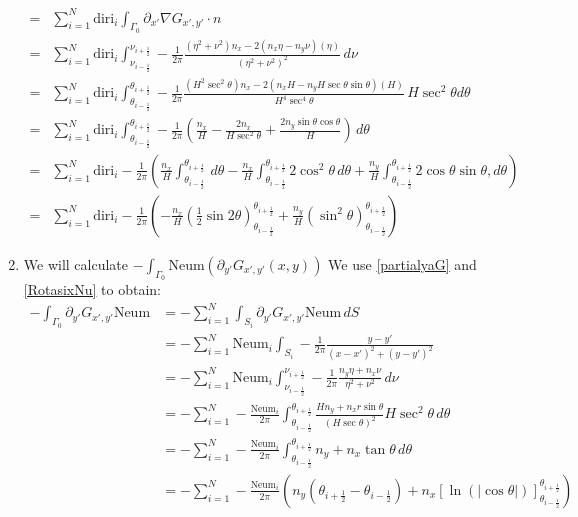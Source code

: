 \documentclass[a4paper,12pt]{article}
\newcommand{\integ}[3]{%
\ensuremath{\displaystyle{\int^{#2}_{#1} #3}}}
\begin{document}
\begin{enumerate}
\begin{align}
=& \sum\limits_{i=1}^N \text{diri}_i \integ{\Gamma_0}{}{\partial_{x'}\nabla G_{x',y'} \cdot n}\\
 =& \sum\limits_{i=1}^N \text{diri}_i \integ{\nu_{i-\frac{1}{2}}}{\nu_{i+\frac{1}{2}}}{-\frac{1}{2\pi} \frac{(\eta^2+\nu^2)n_x-2(n_x\eta-n_y\nu)(\eta)}{(\eta^2+\nu^2)^2} \, d\nu}\\
=&\sum\limits_{i=1}^N \text{diri}_i \integ{\theta_{i-\frac{1}{2}}}{\theta_{i+\frac{1}{2}}}{-\frac{1}{2\pi} \frac{(H^2 \sec^2\theta)n_x-2(n_x H-n_y H \sec \theta \sin \theta)(H)}{H^4 \sec^4\theta} \, H \sec^2\theta d\theta}\\
=&\sum\limits_{i=1}^N \text{diri}_i \integ{\theta_{i-\frac{1}{2}}}{\theta_{i+\frac{1}{2}}}{-\frac{1}{2\pi} \left( \frac{n_x}{H}-\frac{2n_x}{H \sec^2\theta}+\frac{2n_y \sin \theta \cos\theta}{H} \right) \, d\theta}\\
=&\sum\limits_{i=1}^N \text{diri}_i -\frac{1}{2\pi} \left(\frac{n_x}{H} \integ{\theta_{i-\frac{1}{2}}}{\theta_{i+\frac{1}{2}}}{\, d\theta}-
 \frac{n_x}{H} \integ{\theta_{i-\frac{1}{2}}}{\theta_{i+\frac{1}{2}}}{2\cos^2\theta \, d\theta}+
 \frac{n_y}{H} \integ{\theta_{i-\frac{1}{2}}}{\theta_{i+\frac{1}{2}}}{2\cos \theta \sin\theta, d\theta} \right)\\
=&\sum\limits_{i=1}^N \text{diri}_i -\frac{1}{2\pi} \left(-\frac{n_x}{H}(\frac{1}{2}\sin2\theta)_{\theta_{i-\frac{1}{2}}}^{\theta_{i+\frac{1}{2}}}+\frac{n_y}{H}(\sin^2\theta)_{\theta_{i-\frac{1}{2}}}^{\theta_{i+\frac{1}{2}}}\right)\label{intPartialxaNablaGn}
\end{align}

\item We will calculate $-\integ{\Gamma_0}{}{\text{Neum} \left(\partial_{y'}G_{x',y'}(x,y)\right)}$
We use \ref{partialyaG} and \ref{RotasixNu} to obtain:
\begin{align}
 -\integ{\Gamma_0}{}{\partial_{y'} G_{x',y'} \text{Neum}}&=-\sum\limits_{i=1}^N  \integ{S_i}{}{\partial_{y'} G_{x',y'} \text{Neum} \, dS}\\
&=-\sum\limits_{i=1}^N \text{Neum}_i \integ{S_i}{}{-\frac{1}{2\pi}\frac{y-y'}{(x-x')^2+(y-y')^2}}\\
&=-\sum\limits_{i=1}^N \text{Neum}_i \integ{\nu_{i-\frac{1}{2}}}{\nu_{i+\frac{1}{2}}}{-\frac{1}{2\pi} \frac{n_y\eta+n_x \nu}{\eta^2+\nu^2} \, d\nu}\\
&=-\sum\limits_{i=1}^N -\frac{\text{Neum}_i}{2\pi} \integ{\theta_{i-\frac{1}{2}}}{\theta_{i+\frac{1}{2}}}{\frac{H n_y+n_x r \sin\theta}{\left( H\sec\theta\right)^2 }H \sec^2\theta \, d\theta}\\
&=-\sum\limits_{i=1}^N -\frac{\text{Neum}_i}{2\pi} \integ{\theta_{i-\frac{1}{2}}}{\theta_{i+\frac{1}{2}}}{n_y+n_x\tan\theta\, d\theta}\\
&=-\sum\limits_{i=1}^N -\frac{\text{Neum}_i}{2\pi} \left( n_y(\theta_{i+\frac{1}{2}}-\theta_{i-\frac{1}{2}}) +n_x \left[\ln(\vert \cos\theta\vert )\right]_{\theta_{i-\frac{1}{2}}}^{\theta_{i+\frac{1}{2}}} \right)\label{intPartialyaG}
\end{align}


\end{enumerate}
\end{document}
